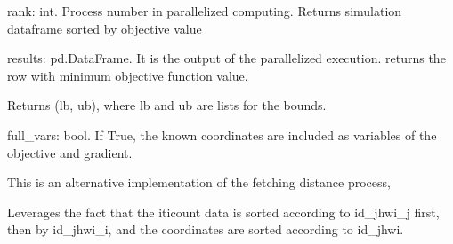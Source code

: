 \documentclass[letterpaper,10pt,english]{sphinxmanual}
\begin{document}
\begin{fulllineitems}
\begin{fulllineitems}
\label{\detokenize{index:estimate.Estimate.gen_data}}
rank: int. Process number in parallelized computing.
Returns simulation dataframe sorted by objective value

\end{fulllineitems}


\begin{fulllineitems}
\label{\detokenize{index:estimate.Estimate.get_best_result}}
results: pd.DataFrame. It is the output of the parallelized execution.
returns the row with minimum objective function value.

\end{fulllineitems}


\begin{fulllineitems}
\label{\detokenize{index:estimate.Estimate.get_bounds}}
Returns (lb, ub), where lb and ub are lists for the bounds.

\end{fulllineitems}


\begin{fulllineitems}
\label{\detokenize{index:estimate.Estimate.get_coordinate_pairs}}
full\_vars: bool. If True, the known coordinates are included as
variables of the objective and gradient.

This is an alternative implementation of the fetching distance process,

Leverages the fact that the iticount data is sorted according to
id\_jhwi\_j first, then by id\_jhwi\_i, and the coordinates are sorted
according to id\_jhwi.

\end{fulllineitems}



\end{fulllineitems}
\end{document}
